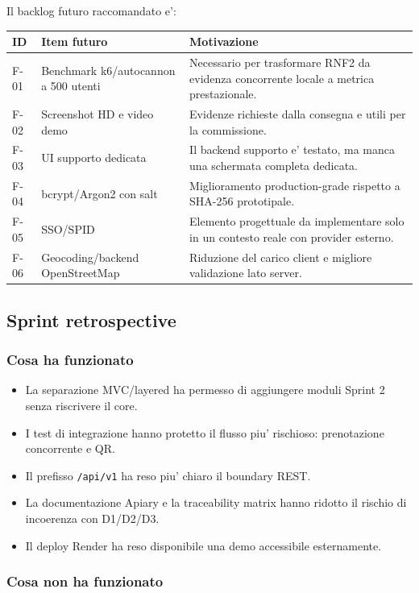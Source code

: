 \documentclass[11pt,a4paper]{article}
\newcommand{\code}[1]{\texttt{#1}}
\begin{document}
Il backlog futuro raccomandato e':

\begin{longtable}{L{1.2cm} L{5.5cm} L{7cm}}
\toprule
\textbf{ID} & \textbf{Item futuro} & \textbf{Motivazione} \\
\midrule
F-01 & Benchmark k6/autocannon a 500 utenti & Necessario per trasformare RNF2 da evidenza concorrente locale a metrica prestazionale. \\
F-02 & Screenshot HD e video demo & Evidenze richieste dalla consegna e utili per la commissione. \\
F-03 & UI supporto dedicata & Il backend supporto e' testato, ma manca una schermata completa dedicata. \\
F-04 & bcrypt/Argon2 con salt & Miglioramento production-grade rispetto a SHA-256 prototipale. \\
F-05 & SSO/SPID & Elemento progettuale da implementare solo in un contesto reale con provider esterno. \\
F-06 & Geocoding/backend OpenStreetMap & Riduzione del carico client e migliore validazione lato server. \\
\bottomrule
\end{longtable}

\subsection{Sprint retrospective}

\subsubsection{Cosa ha funzionato}

\begin{itemize}
  \item La separazione MVC/layered ha permesso di aggiungere moduli Sprint 2 senza riscrivere il core.
  \item I test di integrazione hanno protetto il flusso piu' rischioso: prenotazione concorrente e QR.
  \item Il prefisso \code{/api/v1} ha reso piu' chiaro il boundary REST.
  \item La documentazione Apiary e la traceability matrix hanno ridotto il rischio di incoerenza con D1/D2/D3.
  \item Il deploy Render ha reso disponibile una demo accessibile esternamente.
\end{itemize}

\subsubsection{Cosa non ha funzionato}
\end{document}
